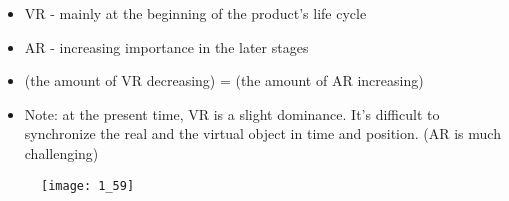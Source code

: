 \documentclass{standalone}
\begin{document}
\begin{itemize}
	\item VR - mainly at the beginning of the product's life cycle
	\item AR - increasing importance in the later stages 
	\item (the amount of VR decreasing) = (the amount of AR increasing)
	\item Note: at the present time, VR is a slight dominance. It's difficult to synchronize the real and the virtual object in time and position. (AR is much challenging)
\end{itemize}

\begin{figure}[H]
	\texttt{[image: 1\_59]}
\end{figure}
\end{document}
